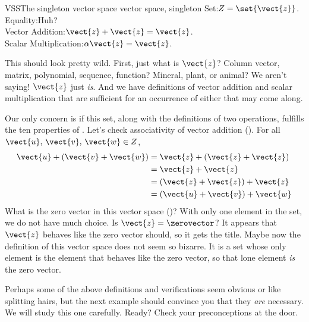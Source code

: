 \begin{example}{VSS}{The singleton vector space }{vector space, singleton}
Set:\quad $Z=\set{\vect{z}}$.\\
Equality:\quad Huh?\\
Vector Addition:\quad  $\vect{z}+\vect{z}=\vect{z}$.\\
Scalar Multiplication:\quad $\alpha\vect{z}=\vect{z}$.\par\medskip
%
This should look pretty wild.  First, just what is $\vect{z}$?  Column vector, matrix, polynomial, sequence, function?  Mineral, plant, or animal?  We aren't saying!  $\vect{z}$ just {\em is}.  And we have definitions of vector addition and scalar multiplication that are sufficient for an occurrence of either that may come along.\par
%
Our only concern is if this set, along with the definitions of two operations, fulfills the ten properties of .  Let's check associativity of vector addition ().  For all $\vect{u},\,\vect{v},\,\vect{w}\in Z$,
%
\begin{align*}
\vect{u}+(\vect{v}+\vect{w})
&=\vect{z}+(\vect{z}+\vect{z})\\
&=\vect{z}+\vect{z}\\
&=(\vect{z}+\vect{z})+\vect{z}\\
&=(\vect{u}+\vect{v})+\vect{w}
\end{align*}
%
What is the zero vector in this vector space ()?  With only one element in the set, we do not have much choice.  Is $\vect{z}=\zerovector$?  It appears that $\vect{z}$ behaves like the zero vector should, so it gets the title.  Maybe now the definition of this vector space does not seem so bizarre.  It is a set whose only element is the element that behaves like the zero vector, so that lone element {\em is} the zero vector.
\end{example}
%
Perhaps some of the above definitions and verifications seem obvious or like splitting hairs, but the next example should convince you that they {\em are} necessary.  We will study this one carefully.  Ready?  Check your preconceptions at the door. 
%
